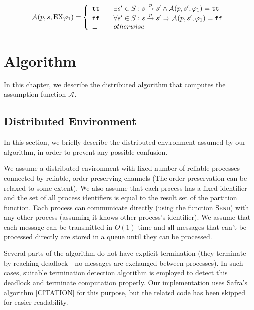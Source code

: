 \documentclass[12pt,oneside,draft]{fithesis2}
\newcommand{\as}[1][]{\ensuremath{\mathcal{A}_{#1}}}
\newcommand{\method}[1]{\textnormal{\textsc{#1}}}
\newcommand{\true}{\ensuremath{\texttt{tt}}}
\newcommand{\false}{\ensuremath{\texttt{ff}}}
\newcommand{\trans}[1]{\stackrel{#1}{\rightarrow}}
\newcommand{\ex}[1]{\ensuremath{\mbox{EX} #1}}
\begin{document}
			\begin{center}								
				\[\as(p, s, \ex{\varphi_1}) = \left\{ 
  					\begin{array}{l l}
					    \true & \quad \exists s' \in S : s \trans{p} s' \wedge \as(p, s', \varphi_1) = \true\\
					   	\false & \quad \forall s' \in S : s \trans{p} s' \Rightarrow \as(p, s', \varphi_1) = \false\\
					   	\perp & \quad otherwise\\
				  \end{array} 
				\right.\]
			\end{center}			
			
		
    \chapter{Algorithm}
    
    	In this chapter, we describe the distributed algorithm that computes the assumption function $\as$. 
    	
    	\section{Distributed Environment}
    	
		In this section, we briefly describe the distributed environment assumed by our algorithm, in order to prevent any possible confusion.
		
		We assume a distributed environment with fixed number of reliable processes connected by reliable, order-preserving channels (The order preservation can be relaxed to some extent). We also assume that each process has a fixed identifier and the set of all process identifiers is equal to the result set of the partition function. Each process can communicate directly (using the function \method{Send}) with any other process (assuming it knows other process's identifier). We assume that each message can be transmitted in $O(1)$ time and all messages that can't be processed directly are stored in a queue until they can be processed.
		
		Several parts of the algorithm do not have explicit termination (they terminate by reaching deadlock - no messages are exchanged between processes). In such cases, suitable termination detection algorithm is employed to detect this deadlock and terminate computation properly. Our implementation uses Safra's algorithm [CITATION] for this purpose, but the related code has been skipped for easier readability.
    	
\end{document}

